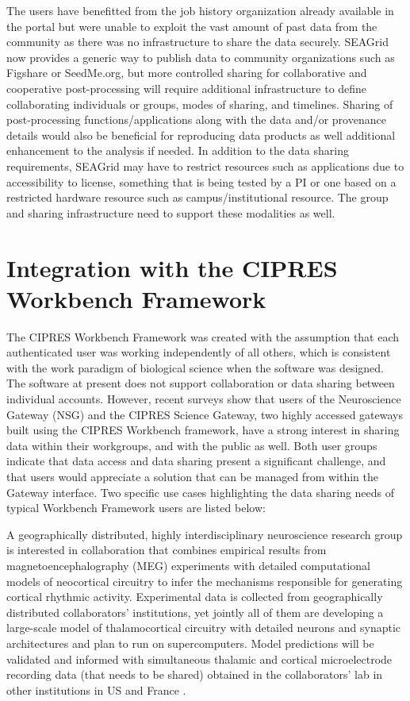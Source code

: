 \documentclass[sigconf]{acmart}
\begin{document}
The users have benefitted from the job history organization already available in the portal but were unable to exploit the vast amount of past data from the community as there was no infrastructure to share the data securely. SEAGrid now provides a generic way to publish data to community organizations such as Figshare or SeedMe.org, but more controlled sharing for collaborative and cooperative post-processing will require additional infrastructure to define collaborating individuals or groups, modes of sharing, and timelines. Sharing of post-processing functions/applications along with the data and/or provenance details would also be beneficial for reproducing data products as well additional enhancement to the analysis if needed.
In addition to the data sharing requirements, SEAGrid may have to restrict resources such as applications due to accessibility to license, something that is being tested by a PI  or one  based on a restricted hardware resource such as campus/institutional  resource. The group and sharing infrastructure need to support these modalities as well. 

\section{Integration with the CIPRES Workbench Framework}\label{nsg}

The CIPRES Workbench Framework \cite{miller2015cipres} was created with the assumption that each authenticated user was working independently of all others, which is consistent with the work paradigm of biological science when the software was designed. The software at present does not support collaboration or data sharing between individual accounts. However, recent surveys show that users of the Neuroscience Gateway (NSG) and the CIPRES Science Gateway, two highly accessed gateways built using the CIPRES Workbench framework, have a strong interest in sharing data within their workgroups, and with the public as well. Both user groups indicate that data access and data sharing present a significant challenge, and that users would appreciate a solution that can be managed from within the Gateway interface. Two specific use cases highlighting the data sharing needs of typical Workbench Framework users  are listed below:

A geographically distributed, highly interdisciplinary neuroscience research group is interested in collaboration that combines empirical results from magnetoencephalography (MEG) experiments with detailed computational models of neocortical circuitry to infer the mechanisms responsible for generating cortical rhythmic activity. Experimental data is collected from geographically distributed collaborators' institutions, yet jointly all of them are developing a large-scale model of thalamocortical circuitry with detailed neurons and synaptic architectures and plan to run on supercomputers. Model predictions will be validated and informed with simultaneous thalamic and cortical microelectrode recording data (that needs to be shared) obtained in the collaborators' lab in other institutions in US and France \cite{delorme2004eeglab}. 
\end{document}

